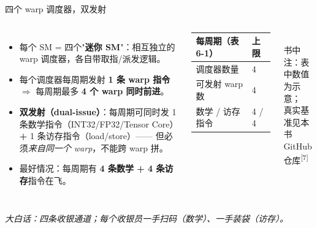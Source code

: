 \documentclass[aspectratio=169]{beamer}
\newcommand{\kw}[1]{\textbf{\textcolor{kwblue}{#1}}}
\newcommand{\pe}[1]{{\footnotesize\itshape 大白话：#1}}
\newcommand{\refmark}[1]{\textsuperscript{[#1]}}
\begin{document}
\begin{frame}{四个 warp 调度器，双发射}
  \begin{columns}[c]
    \begin{itemize}
      \item 每个 SM = 四个"\kw{迷你 SM}"：相互独立的 warp 调度器，各自带取指/派发逻辑。
      \item 每个调度器每周期发射 \kw{1 条 warp 指令} $\Rightarrow$ 每周期最多
            \kw{4 个 warp 同时前进}。
      \item \kw{双发射（dual-issue）}：每周期可同时发 1 条数学指令（INT32/FP32/Tensor Core）
            \kw{+} 1 条访存指令（load/store）—— 但必须\emph{来自同一个 warp}，不能跨 warp 拼。
      \item 最好情况：每周期有 \kw{4 条数学 + 4 条访存}指令在飞。
    \end{itemize}
    \centering
    {\small
    \begin{tabular}{@{}ll@{}}
      \toprule
      \textbf{每周期（表 6-1）} & \textbf{上限} \\
      \midrule
      调度器数量 & 4 \\
      可发射 warp 数 & 4 \\
      数学 / 访存指令 & 4 / 4 \\
      \bottomrule
    \end{tabular}}\\[6pt]
    {\scriptsize 书中注：表中数值为示意；\\真实基准见本书 GitHub 仓库\refmark{7}}
  \end{columns}
  \medskip
  \pe{四条收银通道；每个收银员一手扫码（数学）、一手装袋（访存）。}
\end{frame}
\end{document}
